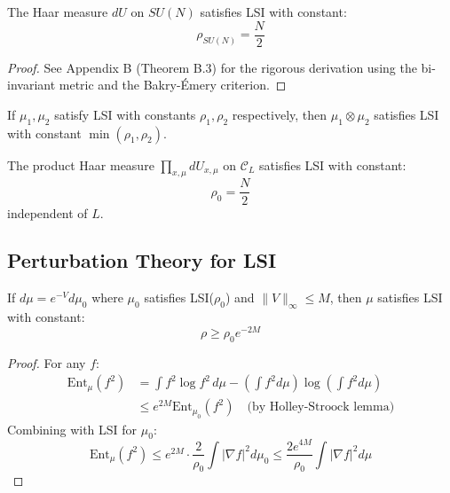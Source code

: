 \begin{theorem}\label{thm:haar-lsi}
The Haar measure $dU$ on $SU(N)$ satisfies LSI with constant:
\begin{equation}
    \rho_{SU(N)} = \frac{N}{2}
\end{equation}
\end{theorem}

\begin{proof}
See Appendix B (Theorem B.3) for the rigorous derivation using the bi-invariant metric and the Bakry-\'Emery criterion.
\end{proof}

\begin{theorem}\label{thm:tensor-lsi}
If $\mu_1, \mu_2$ satisfy LSI with constants $\rho_1, \rho_2$ respectively, then $\mu_1 \otimes \mu_2$ satisfies LSI with constant $\min(\rho_1, \rho_2)$.
\end{theorem}

\begin{corollary}[Lattice LSI at $\beta = 0$]
The product Haar measure $\prod_{x,\mu} dU_{x,\mu}$ on $\mathcal{C}_L$ satisfies LSI with constant:
\begin{equation}
    \rho_0 = \frac{N}{2}
\end{equation}
independent of $L$.
\end{corollary}

\subsection{Perturbation Theory for LSI}

\begin{theorem}\label{thm:holley-stroock}
If $d\mu = e^{-V} d\mu_0$ where $\mu_0$ satisfies LSI($\rho_0$) and $\|V\|_\infty \leq M$, then $\mu$ satisfies LSI with constant:
\begin{equation}
    \rho \geq \rho_0 e^{-2M}
\end{equation}
\end{theorem}

\begin{proof}
For any $f$:
\begin{align}
    \text{Ent}_\mu(f^2) &= \int f^2 \log f^2 \, d\mu - \left(\int f^2 d\mu\right) \log\left(\int f^2 d\mu\right) \\
    &\leq e^{2M} \text{Ent}_{\mu_0}(f^2) \quad \text{(by Holley-Stroock lemma)}
\end{align}
Combining with LSI for $\mu_0$:
\begin{equation}
    \text{Ent}_\mu(f^2) \leq e^{2M} \cdot \frac{2}{\rho_0} \int |\nabla f|^2 d\mu_0 \leq \frac{2e^{4M}}{\rho_0} \int |\nabla f|^2 d\mu
\end{equation}
\end{proof}

